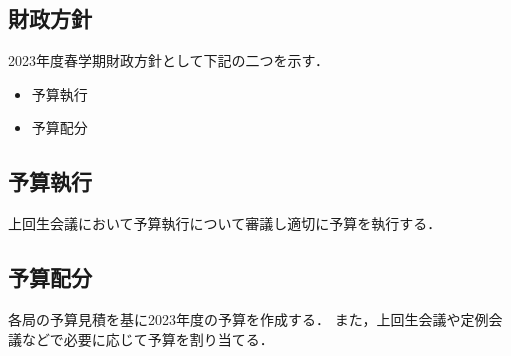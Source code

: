 \subsection*{財政方針}


2023年度春学期財政方針として下記の二つを示す．
\begin{itemize}
    \item 予算執行
    \item 予算配分
\end{itemize}

\subsection*{予算執行}
上回生会議において予算執行について審議し適切に予算を執行する．

\subsection*{予算配分}
各局の予算見積を基に2023年度の予算を作成する．
また，上回生会議や定例会議などで必要に応じて予算を割り当てる．
